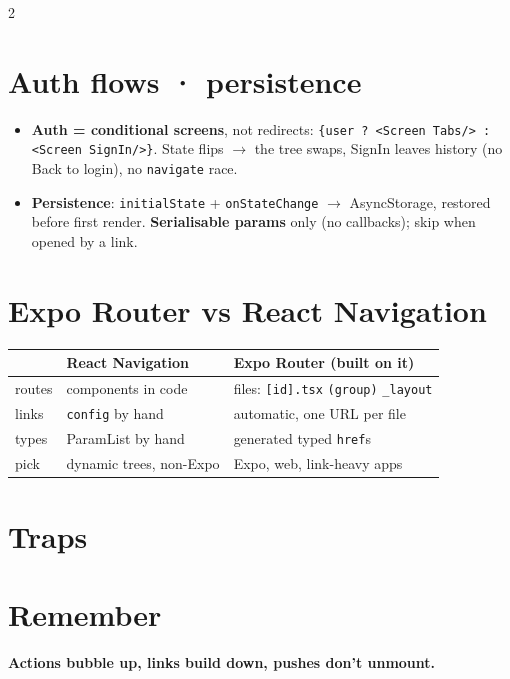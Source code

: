 \documentclass[8pt]{extarticle}
\begin{document}
\begin{multicols}{2}
\section{Auth flows · persistence}
\begin{itemize}
  \item \textbf{Auth = conditional screens}, not redirects:
        \texttt{\{user ? <Screen Tabs/> : <Screen SignIn/>\}}. State flips $\to$ the tree
        swaps, SignIn leaves history (no Back to login), no \texttt{navigate} race.
  \item \textbf{Persistence}: \texttt{initialState} + \texttt{onStateChange} $\to$
        AsyncStorage, restored before first render. \textbf{Serialisable params} only
        (no callbacks); skip when opened by a link.
\end{itemize}

\section{Expo Router vs React Navigation}
{\footnotesize
\begin{tabular}{@{}>{\raggedright\arraybackslash}p{11mm}>{\raggedright\arraybackslash}p{27mm}>{\raggedright\arraybackslash}p{33mm}@{}}
\toprule
 & \textbf{React Navigation} & \textbf{Expo Router} (built on it) \\
\midrule
routes & components in code & files: \texttt{[id].tsx} \texttt{(group)} \texttt{\_layout} \\
links & \texttt{config} by hand & automatic, one URL per file \\
types & ParamList by hand & generated typed \texttt{href}s \\
pick & dynamic trees, non-Expo & Expo, web, link-heavy apps \\
\bottomrule
\end{tabular}}

\section{Traps}
\begin{itemize}
\end{itemize}

\section{Remember}
\textbf{Actions bubble up, links build down, pushes don't unmount.}


\end{multicols}

\end{document}
